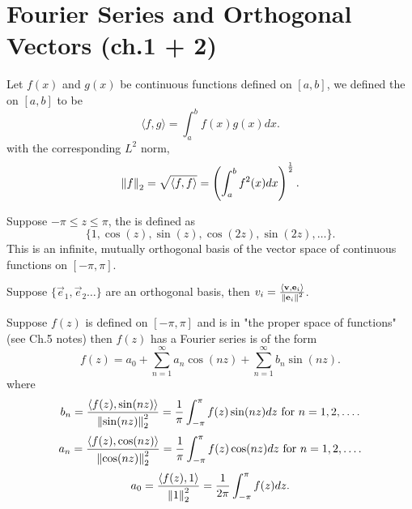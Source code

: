 \documentclass[class=article,crop=false]{standalone}
\begin{document}
\newpage

\section{Fourier Series and Orthogonal Vectors (ch.1 + 2)}
\begin{defn}
	Let $f(x)$ and  $g(x)$ be continuous functions defined on  $[a,b]$, we defined the   on $[a,b]$ to be 
	 \[
		 \langle f,g \rangle = \int_{ a}^{ b} f(x)g(x)dx
	.\] 
	with the corresponding $L^2$ norm,
	\[
		{\left\lVert{f}\right\rVert}_2 = \sqrt{\langle f,f \rangle} = \left( \int_{ a}^{ b} f^2(x) dx  \right)^{\frac{1}{2}}  
	.\] 
\end{defn}
\begin{defn}
Suppose $-\pi\leq z \leq \pi$, the  is defined as 
\[
	\{1,\cos(z), \sin(z ),\cos(2z ),\sin(2z ),\ldots\}
.\] 
This is an infinite, mutually orthogonal basis of the vector space of continuous functions on $[-\pi,\pi]$.
\end{defn}

\begin{defn}[projection]
Suppose $\{\vec{e}_1, \vec{e}_2 \ldots \} $ are an orthogonal basis, then $v_i = \frac{\langle {\mathbf{v}},{\mathbf{e}}_i   \rangle}{{\left\lVert{{\mathbf{e}}_i}\right\rVert}^2 }$.
\end{defn}

\begin{defn}
	Suppose $f(z)$ is defined on  $[-\pi,\pi]$ and is in "the proper space of functions" (see Ch.5 notes) then $f(z)$ has a Fourier series is of the form
	 \[
		 f(z)=a_0 + \sum_{ n=1}^{\infty} a_n \cos(nz ) + \sum_{ n=1}^{\infty} b_n \sin(nz )
	.\]
	where 
	\[
		b_n = \frac{\langle f(z),\sin(nz ) \rangle}{{\left\lVert{\sin(nz )}\right\rVert}_2^2 } = \frac{1}{\pi} \int_{ -\pi}^{ \pi} f(z)\sin(nz )dz \text{ for } n=1,2,\ldots 
	.\]
	\[
		a_n = \frac{\langle f(z),\cos(nz ) \rangle}{{\left\lVert{\cos(nz )}\right\rVert}_2^2 } = \frac{1}{\pi} \int_{ -\pi}^{ \pi} f(z)\cos(nz ) dz \text{ for } n=1,2,\ldots 
	.\]
	\[
		a_0 = \frac{\langle f(z),1 \rangle}{{\left\lVert{1}\right\rVert}_2^2 }= \frac{1}{2\pi} \int_{ -\pi}^{ \pi} f(z) dz 
	.\] 
\end{defn}
\end{document}
